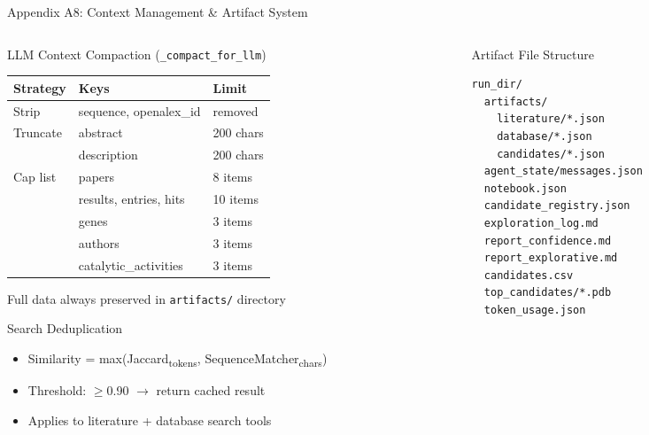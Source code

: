 \documentclass[aspectratio=169, 11pt]{beamer}
\begin{document}
\begin{frame}{Appendix A8: Context Management \& Artifact System}
\vspace{-8pt}
\begin{columns}[T]
\begin{column}{0.48\textwidth}
\begin{block}{\small LLM Context Compaction (\texttt{\_compact\_for\_llm})}
\vspace{-2pt}
{\scriptsize
\begin{tabular}{@{}l l l@{}}
\toprule
\textbf{Strategy} & \textbf{Keys} & \textbf{Limit} \\
\midrule
Strip & sequence, openalex\_id & removed \\
Truncate & abstract & 200 chars \\
 & description & 200 chars \\
Cap list & papers & 8 items \\
 & results, entries, hits & 10 items \\
 & genes & 3 items \\
 & authors & 3 items \\
 & catalytic\_activities & 3 items \\
\bottomrule
\end{tabular}
}
\vspace{2pt}
{\tiny Full data always preserved in \texttt{artifacts/} directory}
\end{block}

\begin{block}{\small Search Deduplication}
\vspace{-2pt}
\begin{itemize}\scriptsize
\setlength\itemsep{0pt}
\item Similarity = max(Jaccard\textsubscript{tokens}, SequenceMatcher\textsubscript{chars})
\item Threshold: $\geq$0.90 $\rightarrow$ return cached result
\item Applies to literature + database search tools
\end{itemize}
\end{block}
\end{column}
\begin{column}{0.48\textwidth}
\begin{exampleblock}{\small Artifact File Structure}
\vspace{-2pt}
{\tiny
\begin{verbatim}
run_dir/
  artifacts/
    literature/*.json
    database/*.json
    candidates/*.json
  agent_state/messages.json
  notebook.json
  candidate_registry.json
  exploration_log.md
  report_confidence.md
  report_explorative.md
  candidates.csv
  top_candidates/*.pdb
  token_usage.json
\end{verbatim}
}
\end{exampleblock}
\end{column}
\end{columns}
\end{frame}
\end{document}

